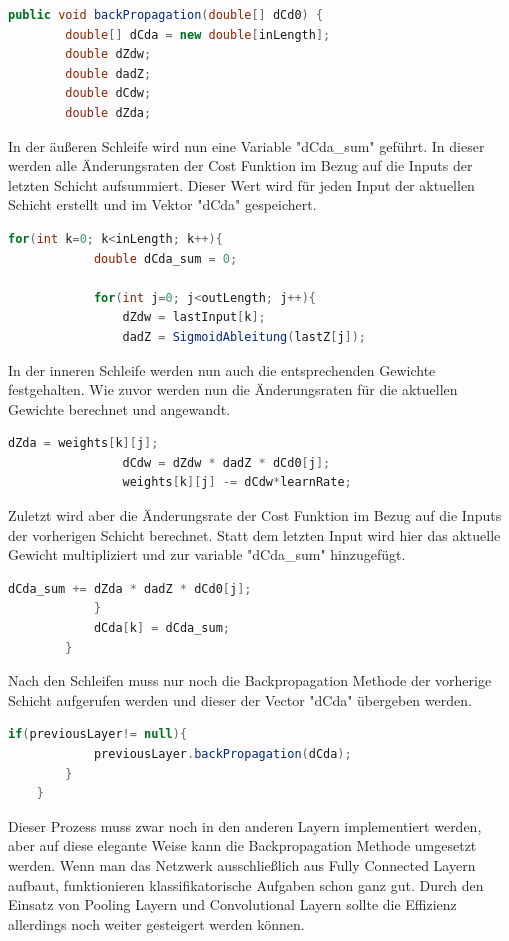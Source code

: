\documentclass[12pt]{article}
\begin{document}
\begin{lstlisting}[language=Java]
    public void backPropagation(double[] dCd0) {
        double[] dCda = new double[inLength];
        double dZdw;
        double dadZ;
        double dCdw;
        double dZda;
\end{lstlisting} 
In der äußeren Schleife wird nun eine Variable "dCda\_sum" geführt. In dieser werden alle Änderungsraten der Cost Funktion im Bezug auf die Inputs der letzten Schicht aufsummiert. Dieser Wert wird für jeden Input der aktuellen Schicht erstellt und im Vektor "dCda" gespeichert.
\begin{lstlisting}[language=Java]  
        for(int k=0; k<inLength; k++){
            double dCda_sum = 0;

            for(int j=0; j<outLength; j++){
                dZdw = lastInput[k];
                dadZ = SigmoidAbleitung(lastZ[j]);
\end{lstlisting} 
In der inneren Schleife werden nun auch die entsprechenden Gewichte festgehalten. Wie zuvor werden nun die Änderungsraten für die aktuellen Gewichte berechnet und angewandt.
\begin{lstlisting}[language=Java]  
                dZda = weights[k][j]; 
                dCdw = dZdw * dadZ * dCd0[j];
                weights[k][j] -= dCdw*learnRate;
\end{lstlisting} 
Zuletzt wird aber die Änderungsrate der Cost Funktion im Bezug auf die Inputs der vorherigen Schicht berechnet. Statt dem letzten Input wird hier das aktuelle Gewicht multipliziert und zur variable "dCda\_sum" hinzugefügt.
\begin{lstlisting}[language=Java]              
                dCda_sum += dZda * dadZ * dCd0[j];
            }
            dCda[k] = dCda_sum;
        }
\end{lstlisting} 
Nach den Schleifen muss nur noch die Backpropagation Methode der vorherige Schicht aufgerufen werden und dieser der Vector "dCda" übergeben werden.
\begin{lstlisting}[language=Java]   
        if(previousLayer!= null){
            previousLayer.backPropagation(dCda);
        }
    }
\end{lstlisting} 

Dieser Prozess muss zwar noch in den anderen Layern implementiert werden, aber auf diese elegante Weise kann die Backpropagation Methode umgesetzt werden. Wenn man das Netzwerk ausschließlich aus Fully Connected Layern aufbaut, funktionieren klassifikatorische Aufgaben schon ganz gut. Durch den Einsatz von Pooling Layern und Convolutional Layern sollte die Effizienz allerdings noch weiter gesteigert werden können.
\end{document}
